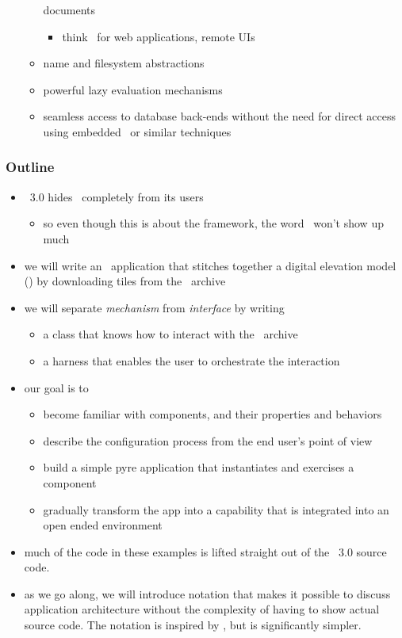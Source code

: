\begin{frame}
\begin{itemize}
\begin{itemize}
        documents
        \begin{itemize}
        \item think \html\ for web applications, remote UIs
        \end{itemize}
      \item name and filesystem abstractions
      \item powerful lazy evaluation mechanisms
      \item seamless access to database back-ends without the need for direct access using
        embedded \sql\ or similar techniques
      \end{itemize}
%
  \end{itemize}
%
\end{frame}

\begin{frame}
%
  \frametitle{Outline}
%
  \begin{itemize}
%
  \item \isce\ 3.0 hides \pyre\ completely from its users
    \begin{itemize}
    \item so even though this is about the framework, the word \pyre\ won't show up much
    \end{itemize}
%
  \item we will write an \isce\ application that stitches together a digital elevation model
    (\dem) by downloading tiles from the \srtm\ archive
%
  \item we will separate \emph{mechanism} from \emph{interface} by writing
    \begin{itemize}
    \item a class that knows how to interact with the \srtm\ archive
    \item a harness that enables the user to orchestrate the interaction
    \end{itemize}
%
  \item our goal is to
    \begin{itemize}
    \item become familiar with components, and their properties and behaviors
    \item describe the configuration process from the end user's point of view
    \item build a simple pyre application that instantiates and exercises a component
    \item gradually transform the app into a capability that is integrated into an open ended
      environment
    \end{itemize}
%
  \item much of the code in these examples is lifted straight out of the \isce\ 3.0 source
    code.
%
  \item as we go along, we will introduce notation that makes it possible to discuss
    application architecture without the complexity of having to show actual source code. The
    notation is inspired by \uml\supercite{uml-99,uml-05}, but is significantly simpler.
%
  \end{itemize}
%
\end{frame}

